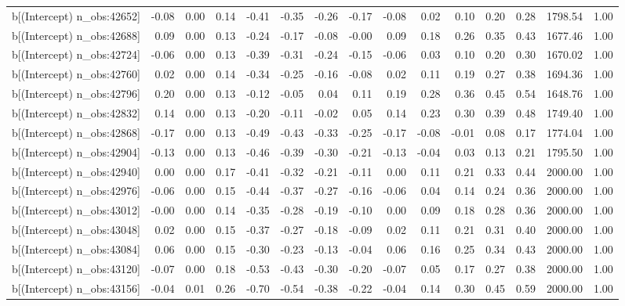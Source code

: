 \begin{table}[ht]
\begin{tabular}{rrrrrrrrrrrrrrr}
  b[(Intercept) n\_obs:42652] & -0.08 & 0.00 & 0.14 & -0.41 & -0.35 & -0.26 & -0.17 & -0.08 & 0.02 & 0.10 & 0.20 & 0.28 & 1798.54 & 1.00 \\ 
  b[(Intercept) n\_obs:42688] & 0.09 & 0.00 & 0.13 & -0.24 & -0.17 & -0.08 & -0.00 & 0.09 & 0.18 & 0.26 & 0.35 & 0.43 & 1677.46 & 1.00 \\ 
  b[(Intercept) n\_obs:42724] & -0.06 & 0.00 & 0.13 & -0.39 & -0.31 & -0.24 & -0.15 & -0.06 & 0.03 & 0.10 & 0.20 & 0.30 & 1670.02 & 1.00 \\ 
  b[(Intercept) n\_obs:42760] & 0.02 & 0.00 & 0.14 & -0.34 & -0.25 & -0.16 & -0.08 & 0.02 & 0.11 & 0.19 & 0.27 & 0.38 & 1694.36 & 1.00 \\ 
  b[(Intercept) n\_obs:42796] & 0.20 & 0.00 & 0.13 & -0.12 & -0.05 & 0.04 & 0.11 & 0.19 & 0.28 & 0.36 & 0.45 & 0.54 & 1648.76 & 1.00 \\ 
  b[(Intercept) n\_obs:42832] & 0.14 & 0.00 & 0.13 & -0.20 & -0.11 & -0.02 & 0.05 & 0.14 & 0.23 & 0.30 & 0.39 & 0.48 & 1749.40 & 1.00 \\ 
  b[(Intercept) n\_obs:42868] & -0.17 & 0.00 & 0.13 & -0.49 & -0.43 & -0.33 & -0.25 & -0.17 & -0.08 & -0.01 & 0.08 & 0.17 & 1774.04 & 1.00 \\ 
  b[(Intercept) n\_obs:42904] & -0.13 & 0.00 & 0.13 & -0.46 & -0.39 & -0.30 & -0.21 & -0.13 & -0.04 & 0.03 & 0.13 & 0.21 & 1795.50 & 1.00 \\ 
  b[(Intercept) n\_obs:42940] & 0.00 & 0.00 & 0.17 & -0.41 & -0.32 & -0.21 & -0.11 & 0.00 & 0.11 & 0.21 & 0.33 & 0.44 & 2000.00 & 1.00 \\ 
  b[(Intercept) n\_obs:42976] & -0.06 & 0.00 & 0.15 & -0.44 & -0.37 & -0.27 & -0.16 & -0.06 & 0.04 & 0.14 & 0.24 & 0.36 & 2000.00 & 1.00 \\ 
  b[(Intercept) n\_obs:43012] & -0.00 & 0.00 & 0.14 & -0.35 & -0.28 & -0.19 & -0.10 & 0.00 & 0.09 & 0.18 & 0.28 & 0.36 & 2000.00 & 1.00 \\ 
  b[(Intercept) n\_obs:43048] & 0.02 & 0.00 & 0.15 & -0.37 & -0.27 & -0.18 & -0.09 & 0.02 & 0.11 & 0.21 & 0.31 & 0.40 & 2000.00 & 1.00 \\ 
  b[(Intercept) n\_obs:43084] & 0.06 & 0.00 & 0.15 & -0.30 & -0.23 & -0.13 & -0.04 & 0.06 & 0.16 & 0.25 & 0.34 & 0.43 & 2000.00 & 1.00 \\ 
  b[(Intercept) n\_obs:43120] & -0.07 & 0.00 & 0.18 & -0.53 & -0.43 & -0.30 & -0.20 & -0.07 & 0.05 & 0.17 & 0.27 & 0.38 & 2000.00 & 1.00 \\ 
  b[(Intercept) n\_obs:43156] & -0.04 & 0.01 & 0.26 & -0.70 & -0.54 & -0.38 & -0.22 & -0.04 & 0.14 & 0.30 & 0.45 & 0.59 & 2000.00 & 1.00 \\ 

\end{tabular}
\end{table}
